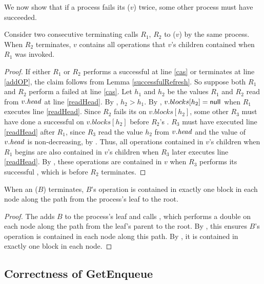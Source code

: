 We now show that if a process fails its ($v$) twice, some other process must have succeeded.

\begin{lemma}\label{lem::doubleRefresh}
Consider two consecutive terminating calls $R_1$, $R_2$ to ($v$) by the same process.
When $R_2$ terminates, $v$ contains all operations that $v$'s children contained when $R_1$ was invoked.
\end{lemma}
\begin{proof}
If either $R_1$ or $R_2$ performs a successful  at line \ref{cas} or terminates at line \ref{addOP}, the claim follows
from Lemma \ref{successfulRefresh}.
So suppose both $R_1$ and $R_2$ perform a failed  at line \ref{cas}.
Let $h_1$ and $h_2$ be the values $R_1$ and $R_2$ read from $v.\mbox{\textit{head}}$ at line \ref{readHead}.
By , $h_2>h_1$.
By , $v.blocks[h_2]=\mbox{\sf null}$ when $R_1$ executes line \ref{readHead}.
Since $R_2$ fails its  on $v.blocks[h_2]$, some other  $R_3$ must have done
a successful  on $v.blocks[h_2]$ before $R_2$'s .
$R_3$ must have executed line \ref{readHead} after $R_1$, since $R_3$ read the value $h_2$ from $v.\mbox{\textit{head}}$ and the value of $v.\mbox{\textit{head}}$ is non-decreasing, by .
Thus, all operations contained in $v$'s children when $R_1$ begins
are also contained in $v$'s children when $R_3$ later executes line \ref{readHead}.
By , these operations are contained in $v$ when $R_3$ performs its successful ,
which is before $R_2$ terminates.
\end{proof}

\begin{lemma} \label{lem::appendExactlyOnce}
When an ($B$) terminates, $B$'s operation is contained in exactly one block in each node along the path from the process's leaf to the root.
\end{lemma}
\begin{proof}
The  adds $B$ to the process's leaf and calls , which
performs a double  on each node along the path from the leaf's parent to the root.
By , this ensures $B$'s operation is contained in each node along this path.
By , it is contained in exactly one block in each node.
\end{proof}

\subsection{Correctness of GetEnqueue}

